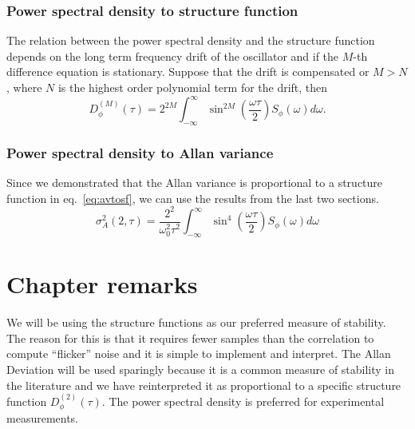 \subsubsection*{Power spectral density to structure function}
%
The relation between the power spectral density and the structure function depends on the long term frequency drift of the oscillator and if the $M$-th difference equation is stationary. Suppose that the drift is compensated or $M > N$, where $N$ is the highest order polynomial term for the drift, then
%
\begin{equation}
	D_\phi^{(M)}(\tau) = 2^{2M}\int_{-\infty}^{\infty} \sin^{2M}\left( \frac{\omega\tau}{2}\right) S_\phi(\omega) d\omega.
\end{equation}

\subsubsection*{Power spectral density to Allan variance}
%
Since we demonstrated that the Allan variance is proportional to a structure function in eq.~\ref{eq:avtosf}, we can use the results from the last two sections.
%
\begin{equation}
\sigma_A^2(2,\tau) = \frac{2^2}{\omega_0^2\tau^2} \int_{-\infty}^{\infty} \sin^4\left( \frac{\omega\tau}{2} \right) S_\phi(\omega) d\omega
\end{equation}

\section{Chapter remarks} \label{sec:2conc}
%
We will be using the structure functions as our preferred measure of stability. The reason for this is that it requires fewer samples than the correlation to compute ``flicker'' noise \cite{} and it is simple to implement and interpret. The Allan Deviation will be used sparingly because it is a common measure of stability in the literature and we have reinterpreted it as proportional to a specific structure function $D_\phi^{(2)}(\tau)$. The power spectral density is preferred for experimental measurements.


